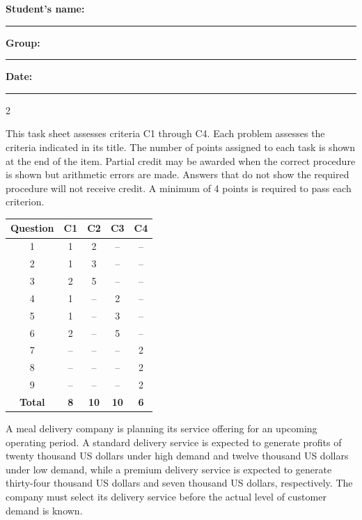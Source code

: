 	\vspace{0.1cm}
	\noindent
	\textbf{Student's name:} \rule{7cm}{0.4pt}\hfill
	\textbf{Group:} \rule{2cm}{0.4pt}\hfill
	\textbf{Date:} \rule{3cm}{0.4pt}
	
	\raggedcolumns
	\begin{multicols}{2}
		
		\vspace{-0.25cm}
		This task sheet assesses criteria C1 through C4. Each problem assesses the criteria indicated in its title. The number of points assigned to each task is shown at the end of the item. Partial credit may be awarded when the correct procedure is shown but arithmetic errors are made. Answers that do not show the required procedure will not receive credit. A minimum of 4 points is required to pass each criterion.
		
		\begin{center}
			\begin{tabular}{|c|c|c|c|c|}
				\hline
				\textbf{Question} & \textbf{C1} & \textbf{C2} & \textbf{C3} & \textbf{C4} \\ \hline
				1 & 1 & 2 & -- & -- \\ \hline
				2 & 1 & 3 & -- & -- \\ \hline
				3 & 2 & 5 & -- & -- \\ \hline
				4 & 1 & -- & 2 & -- \\ \hline
				5 & 1 & -- & 3 & -- \\ \hline
				6 & 2 & -- & 5 & -- \\ \hline
				7 & -- & -- & -- & 2 \\ \hline
				8 & -- & -- & -- & 2 \\ \hline
				9 & -- & -- & -- & 2 \\ \hline
				\textbf{Total} & \textbf{8} & \textbf{10} & \textbf{10} & \textbf{6} \\ \hline
			\end{tabular}
		\end{center}
		
		\columnbreak
		
		A meal delivery company is planning its service offering for an upcoming operating period. A standard delivery service is expected to generate profits of twenty thousand US dollars under high demand and twelve thousand US dollars under low demand, while a premium delivery service is expected to generate thirty-four thousand US dollars and seven thousand US dollars, respectively. The company must select its delivery service before the actual level of customer demand is known.
		

\end{multicols}
